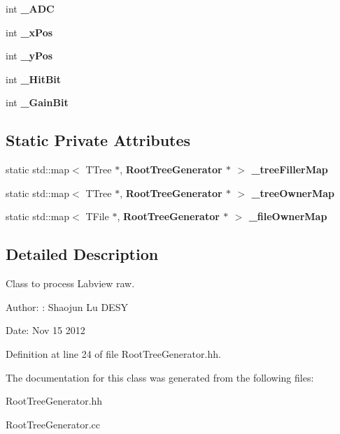 \begin{CompactItemize}
\item 
int \bf{\_\-ADC}\label{classCALICE_1_1RootTreeGenerator_efe0fe5186c9b8348bf4ab7d0602a4fa}

\item 
int \bf{\_\-x\-Pos}\label{classCALICE_1_1RootTreeGenerator_6ef7b392828476b6919e649fda591f17}

\item 
int \bf{\_\-y\-Pos}\label{classCALICE_1_1RootTreeGenerator_dab30b6874a9c44dab78e0fa229ad88e}

\item 
int \bf{\_\-Hit\-Bit}\label{classCALICE_1_1RootTreeGenerator_6ac1a75da7f3c1e15123c60ad5e08f84}

\item 
int \bf{\_\-Gain\-Bit}\label{classCALICE_1_1RootTreeGenerator_7b2a24933acb0e0ffc3110c0bc499139}

\end{CompactItemize}
\subsection*{Static Private Attributes}
\begin{CompactItemize}
\item 
static std::map$<$ TTree $\ast$, \bf{Root\-Tree\-Generator} $\ast$ $>$ \bf{\_\-tree\-Filler\-Map}\label{classCALICE_1_1RootTreeGenerator_79ecf2c699dfed59404b8684164f11a2}

\item 
static std::map$<$ TTree $\ast$, \bf{Root\-Tree\-Generator} $\ast$ $>$ \bf{\_\-tree\-Owner\-Map}\label{classCALICE_1_1RootTreeGenerator_343226afe91fbfba01665ca5f423e5c8}

\item 
static std::map$<$ TFile $\ast$, \bf{Root\-Tree\-Generator} $\ast$ $>$ \bf{\_\-file\-Owner\-Map}\label{classCALICE_1_1RootTreeGenerator_758f6e59b794d633abf036395588f971}

\end{CompactItemize}


\subsection{Detailed Description}
Class to process Labview raw. 

\begin{Desc}
\item[Author:]: Shaojun Lu DESY \end{Desc}
\begin{Desc}
\item[Date:]Nov 15 2012 \end{Desc}




Definition at line 24 of file Root\-Tree\-Generator.hh.

The documentation for this class was generated from the following files:\begin{CompactItemize}
\item 
Root\-Tree\-Generator.hh\item 
Root\-Tree\-Generator.cc\end{CompactItemize}
